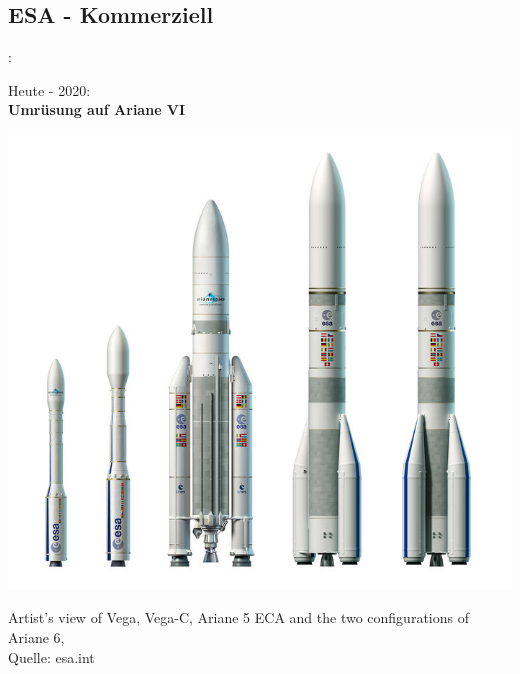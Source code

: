 \documentclass[notes]{beamer}
\begin{document}
\subsection{ESA - Kommerziell}
\begin{frame}{\insertsection: \insertsubsection}
	\begin{minipage}{.45\textwidth}
		
		Heute - 2020: \\
		\textbf{Umrüsung auf Ariane VI} \\
		
				
			\end{minipage} \quad
			\begin{minipage}{.5\textwidth}
				\includegraphics[width=\linewidth]{arianevi}
					
					{\tiny Artist's view of Vega, Vega-C, Ariane 5 ECA and the 
					two configurations of Ariane 6,
						\\ Quelle: esa.int}
			\end{minipage}
\end{frame}
\end{document}
